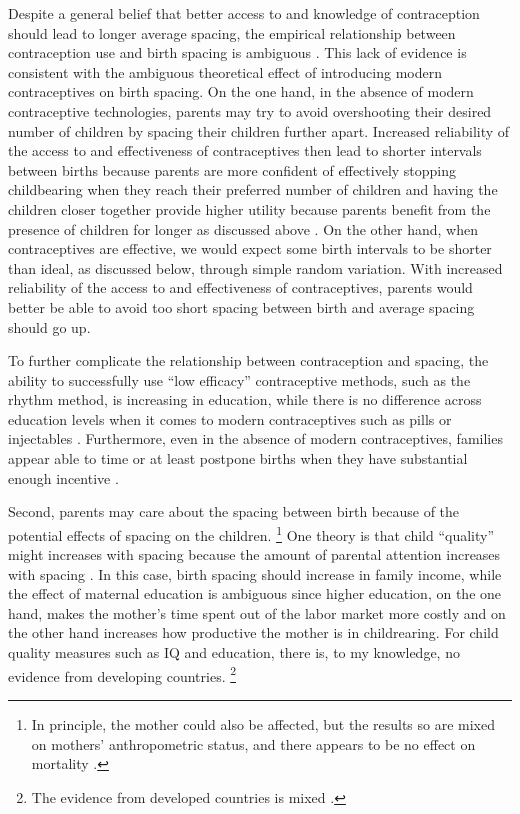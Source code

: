 Despite a general belief that better access to and knowledge of contraception should lead
to longer average spacing, the empirical relationship between contraception use and birth 
spacing is ambiguous \citep{Tulasidhar1993,Whitworth2002,Bhalotra2008,Yeakey2009,Kim2010,Soest2018}.
This lack of evidence is consistent with the ambiguous theoretical effect of introducing 
modern contraceptives on birth spacing.
On the one hand, in the absence of modern contraceptive technologies, parents may try to 
avoid overshooting their desired number of children by spacing their children further apart.
Increased reliability of the access to and effectiveness of contraceptives then lead to 
shorter intervals between births because parents are more confident of effectively
stopping childbearing when they reach their preferred number of children and having
the children closer together provide higher utility because parents benefit from the
presence of children for longer as discussed above \citep{Keyfitz1971,Heckman1976}.
On the other hand, when contraceptives are effective, we would expect some birth 
intervals to be shorter than ideal, as discussed below, through simple random
variation.
With increased reliability of the  access to and effectiveness of contraceptives, parents 
would better be able to avoid too short spacing between birth and average spacing
should go up.

To further complicate the relationship between contraception and spacing, the ability to 
successfully use ``low efficacy'' contraceptive methods, such as the rhythm method, is 
increasing in education, while there is no difference across education levels 
when it comes to modern contraceptives such as pills or injectables \citep{Rosenzweig1989}.
Furthermore, even in the absence of modern contraceptives, families appear able to time or 
at least postpone births when they have substantial enough incentive 
\citep{Jayachandran2011,Alam2018}.


Second, parents may care about the spacing between birth because of the potential effects of spacing on the children.%
\footnote{
In principle, the mother could also be affected, but the results
so are mixed on mothers' 
anthropometric status, and there appears to be no effect on mortality 
\citep{Ronsmans1998,Menken2003,Dewey2007,Conde-Agudelo2012}.
}
One theory is that child ``quality'' might increases with spacing 
because the amount of parental attention increases with spacing
\citep{Zajonc1975,Zajonc1976,Razin1980}.
In this case, birth spacing should increase in family income, while the effect of maternal 
education is ambiguous since higher education, on the one hand, makes the mother's time spent 
out of the labor market more costly and on the other hand increases how productive the 
mother is in childrearing. 
For child quality measures such as IQ and education, there is, to my knowledge, no evidence 
from developing countries.%
\footnote{
The evidence from developed countries is mixed
\citep{Powell1993,Pettersson-Lidbom2009,Buckles2012,Barclay2017}.
} 

